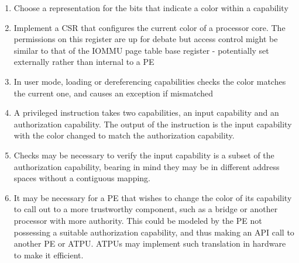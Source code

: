 \begin{enumerate}
\item Choose a representation for the bits that indicate a color within a capability
\item Implement a CSR that configures the current color of a processor core.  The
permissions on this register are up for debate but access control might be
similar to that of the IOMMU page table base register - potentially
set externally rather than internal to a PE
\item In user mode, loading or dereferencing capabilities checks the color
matches the current one, and causes an exception if mismatched
\item A privileged instruction takes two capabilities, an input capability
and an authorization capability.  The output of the instruction is the input
capability with the color changed to match the authorization capability.
\item Checks may be necessary to verify the input capability is a subset of the
authorization capability, bearing in mind they may be in different address
spaces without a contiguous mapping.
\item It may be necessary for a PE that wishes to change the color of its
capability to call out to a more trustworthy component, such as a bridge or
another processor with more authority.  This could be modeled by the PE not
possessing a suitable authorization capability, and thus making an API call to
another PE or ATPU.  ATPUs may implement such translation in hardware to
make it efficient.
\end{enumerate}
